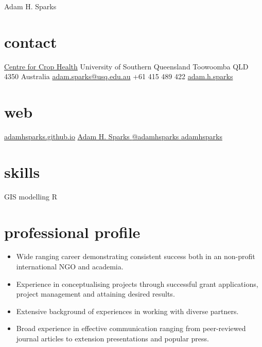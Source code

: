 
\hfill {\Huge Adam H. Sparks}
\begin{aside}
\small{\section{contact}}
\small{\href{http://www.usq.edu.au/research/research-at-usq/institutes-centres/cch}{Centre for Crop Health}}
\small{University of Southern Queensland}
\small{Toowoomba QLD 4350}
\small{Australia}
\small{\href{mailto:adam.sparks@usq.edu.au}{adam.sparks@usq.edu.au}}
\small{+61 415 489 422 \faMobilePhone{}}
\small{\href{skype:adam.h.sparks?call}{adam.h.sparks }}
\section{web}
\small{\href{https://adamhsparks.github.io}{adamhsparks.github.io}}
\small{\href{https://www.linkedin.com/in/adam-h-sparks-507b968}{Adam H. Sparks {\color{linkedin}\FA {}}}}
\small{\href{https://www.twitter.com/adamhsparks/}{@adamhsparks {\color{twitter.blue}\FA {}}}}
\small{\href{https://github.com/adamhsparks/}{adamhsparks \FA {}}}
\small{\section{skills}}
\small{GIS}
\small{modelling}
\small{R}
\end{aside}

\section*{professional profile}

\begin{itemize}
\setlength{\leftmargin}{0pt}
\item Wide ranging career demonstrating consistent success both in an non-profit international NGO and academia.
\item Experience in conceptualising projects through successful grant applications, project management and attaining desired results.
\item Extensive background of experiences in working with diverse partners.
\item Broad experience in effective communication ranging from peer-reviewed journal articles to extension presentations and popular press.
\end{itemize}


